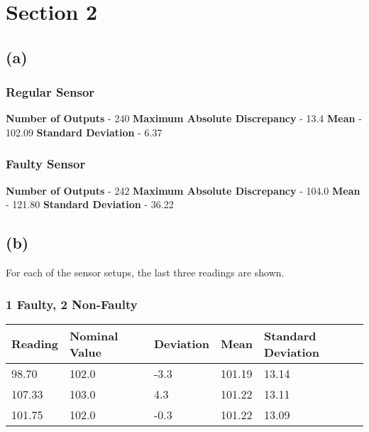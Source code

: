 \documentclass[]{report}
\begin{document}
		\section{Section 2}
			\subsection{(a)}
				\subsubsection{Regular Sensor}
				\textbf{Number of Outputs} - 240 \newline
				\textbf{Maximum Absolute Discrepancy} - 13.4 \newline
				\textbf{Mean} - 102.09 \newline
				\textbf{Standard Deviation} - 6.37 \newline
				
				\subsubsection{Faulty Sensor}
				\textbf{Number of Outputs} - 242 \newline
				\textbf{Maximum Absolute Discrepancy} - 104.0 \newline
				\textbf{Mean} - 121.80 \newline
				\textbf{Standard Deviation} - 36.22 \newline
			
			
			\subsection{(b)}
				For each of the sensor setups, the last three readings are shown.
				\subsubsection{1 Faulty, 2 Non-Faulty}
					\begin{table}[h!]
						\begin{tabular}{| l | l | l | l | l |}
							\hline
							Reading & Nominal Value & Deviation & Mean   & Standard Deviation \\
							\hline
							98.70   & 102.0         & -3.3      & 101.19 & 13.14              \\
							107.33  & 103.0         & 4.3       & 101.22 & 13.11              \\
							101.75  & 102.0         & -0.3      & 101.22 & 13.09        	\\
							\hline      
						\end{tabular}
					\end{table}			
			
\end{document}
